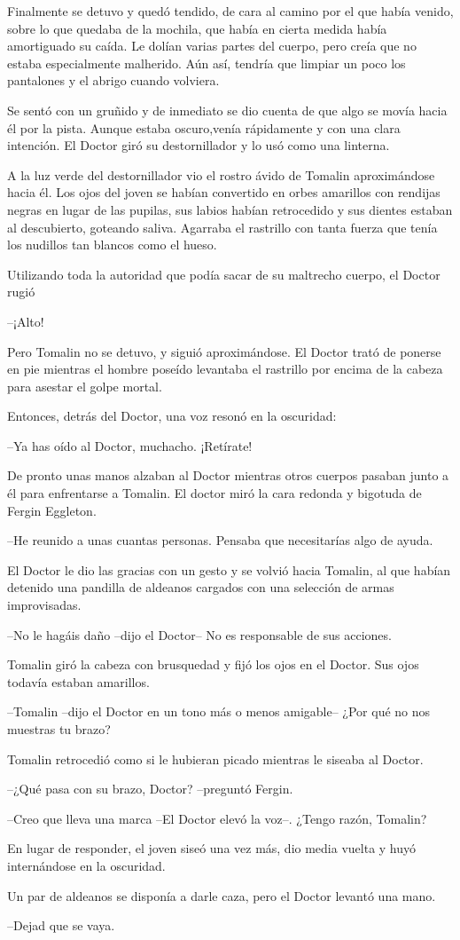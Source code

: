 Finalmente se detuvo y quedó tendido, de cara al camino por el que había venido, sobre lo que quedaba de la mochila, que había en cierta medida había amortiguado su caída. Le dolían varias partes del cuerpo, pero creía que no estaba especialmente malherido. Aún así, tendría que limpiar un poco los pantalones y el abrigo cuando volviera.

Se sentó con un gruñido y de inmediato se dio cuenta de que algo se movía hacia él por la pista. Aunque estaba oscuro,venía rápidamente y con una clara intención. El Doctor giró su destornillador y lo usó como una linterna.

A la luz verde del destornillador vio el rostro ávido de Tomalin aproximándose hacia él. Los ojos del joven se habían convertido en orbes amarillos con rendijas negras en lugar de las pupilas, sus labios habían retrocedido y sus dientes estaban al descubierto, goteando saliva. Agarraba el rastrillo con tanta fuerza que tenía los nudillos tan blancos como el hueso.

Utilizando toda la autoridad que podía sacar de su maltrecho cuerpo, el Doctor rugió 

--¡Alto!

Pero Tomalin no se detuvo, y siguió aproximándose. El Doctor trató de ponerse en pie mientras el hombre poseído levantaba el rastrillo por encima de la cabeza para asestar el golpe mortal.

Entonces, detrás del Doctor, una voz resonó en la oscuridad:

--Ya has oído al Doctor, muchacho. ¡Retírate!

De pronto unas manos alzaban al Doctor mientras otros cuerpos pasaban junto a él para enfrentarse a Tomalin. El doctor miró la cara redonda y bigotuda de Fergin Eggleton.

--He reunido a unas cuantas personas. Pensaba que necesitarías algo de ayuda.

El Doctor le dio las gracias con un gesto y se volvió hacia Tomalin, al que habían detenido una pandilla de aldeanos cargados con una selección de armas improvisadas.

--No le hagáis daño --dijo el Doctor-- No es responsable de sus acciones.

Tomalin giró la cabeza con brusquedad y fijó los ojos en el Doctor. Sus ojos todavía estaban amarillos.

--Tomalin --dijo el Doctor en un tono más o menos amigable-- ¿Por qué no nos muestras tu brazo?

Tomalin retrocedió como si le hubieran picado mientras le siseaba al Doctor.

--¿Qué pasa con su brazo, Doctor? --preguntó Fergin.

--Creo que lleva una marca --El Doctor elevó la voz--. ¿Tengo razón, Tomalin?

En lugar de responder, el joven siseó una vez más, dio media vuelta y huyó internándose en la oscuridad.

Un par de aldeanos se disponía a darle caza, pero el Doctor levantó una mano.

--Dejad que se vaya.
